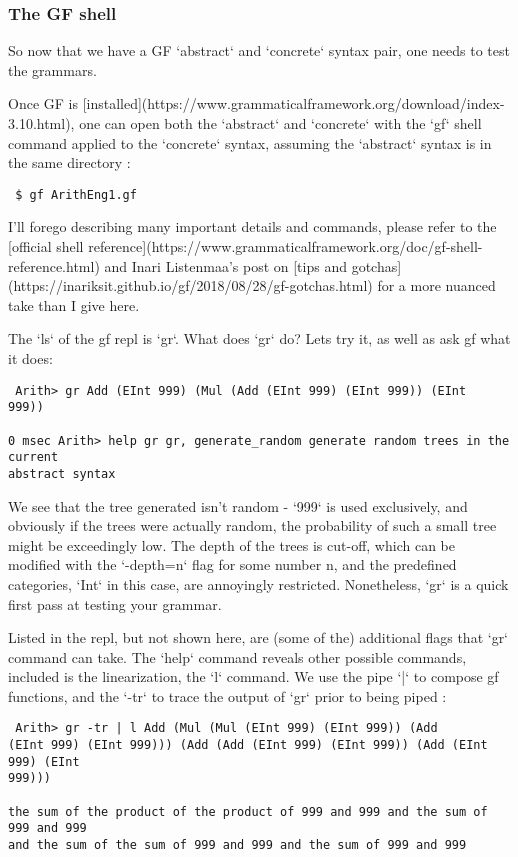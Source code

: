 \documentclass[11pt, a4paper]{article}
\begin{document}
\subsubsection{The GF shell}

So now that we have a GF `abstract` and `concrete` syntax pair, one needs to
test the grammars.

Once GF is
[installed](https://www.grammaticalframework.org/download/index-3.10.html), one
can open both the `abstract` and `concrete` with the `gf` shell command applied
to the `concrete` syntax, assuming the `abstract` syntax is in the same
directory :

\begin{verbatim} $ gf ArithEng1.gf
\end{verbatim}

I'll forego describing many important details and commands, please refer to the
[official shell
reference](https://www.grammaticalframework.org/doc/gf-shell-reference.html) and
Inari Listenmaa's post on [tips and
gotchas](https://inariksit.github.io/gf/2018/08/28/gf-gotchas.html) for a more
nuanced take than I give here.

The `ls` of the gf repl is `gr`. What does `gr` do? Lets try it, as well as ask
gf what it does:

\begin{verbatim} Arith> gr Add (EInt 999) (Mul (Add (EInt 999) (EInt 999)) (EInt
999))

0 msec Arith> help gr gr, generate_random generate random trees in the current
abstract syntax
\end{verbatim}

We see that the tree generated isn't random - `999` is used exclusively, and
obviously if the trees were actually random, the probability of such a small
tree might be exceedingly low. The depth of the trees is cut-off, which can be
modified with the `-depth=n` flag for some number n, and the predefined
categories, `Int` in this case, are annoyingly restricted. Nonetheless, `gr` is
a quick first pass at testing your grammar.

Listed in the repl, but not shown here, are (some of the) additional flags that
`gr` command can take. The `help` command reveals other possible commands,
included is the linearization, the `l` command. We use the pipe `|` to compose
gf functions, and the `-tr` to trace the output of `gr` prior to being piped :

\begin{verbatim} Arith> gr -tr | l Add (Mul (Mul (EInt 999) (EInt 999)) (Add
(EInt 999) (EInt 999))) (Add (Add (EInt 999) (EInt 999)) (Add (EInt 999) (EInt
999)))

the sum of the product of the product of 999 and 999 and the sum of 999 and 999
and the sum of the sum of 999 and 999 and the sum of 999 and 999
\end{verbatim}
\end{document}
